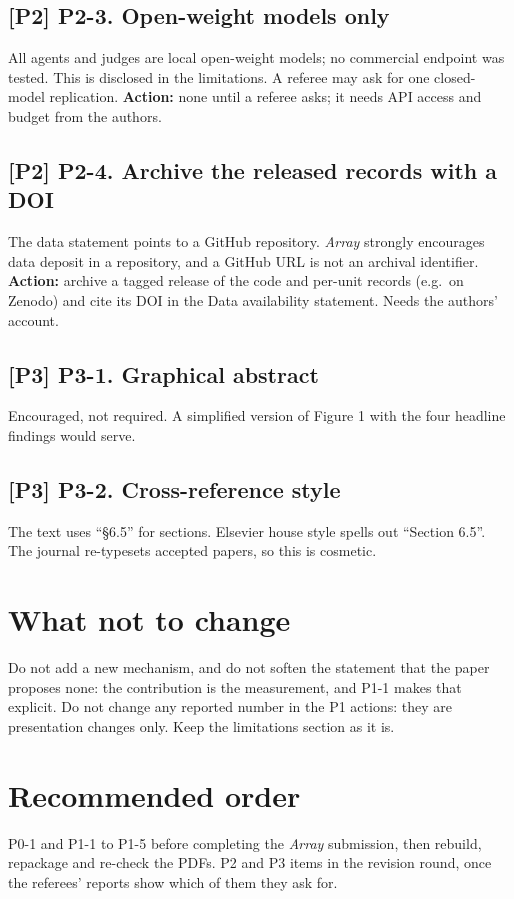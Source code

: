 \documentclass[10pt]{article}
\newcommand{\pt}{\textbf{[P2]}}
\newcommand{\pth}{\textbf{[P3]}}
\begin{document}
\subsection*{\pt{} P2-3. Open-weight models only}
All agents and judges are local open-weight models; no commercial endpoint was tested. This is disclosed in the
limitations. A referee may ask for one closed-model replication.
\textbf{Action:} none until a referee asks; it needs API access and budget from the authors.

\subsection*{\pt{} P2-4. Archive the released records with a DOI}
The data statement points to a GitHub repository. \emph{Array} strongly encourages data deposit in a repository, and
a GitHub URL is not an archival identifier.
\textbf{Action:} archive a tagged release of the code and per-unit records (e.g.\ on Zenodo) and cite its DOI in the
Data availability statement. Needs the authors' account.

\subsection*{\pth{} P3-1. Graphical abstract}
Encouraged, not required. A simplified version of Figure 1 with the four headline findings would serve.

\subsection*{\pth{} P3-2. Cross-reference style}
The text uses ``\S6.5'' for sections. Elsevier house style spells out ``Section 6.5''. The journal re-typesets
accepted papers, so this is cosmetic.

\section{What not to change}
Do not add a new mechanism, and do not soften the statement that the paper proposes none: the contribution is the
measurement, and P1-1 makes that explicit. Do not change any reported number in the P1 actions: they are presentation
changes only. Keep the limitations section as it is.

\section{Recommended order}
P0-1 and P1-1 to P1-5 before completing the \emph{Array} submission, then rebuild, repackage and re-check the PDFs.
P2 and P3 items in the revision round, once the referees' reports show which of them they ask for.
\end{document}
